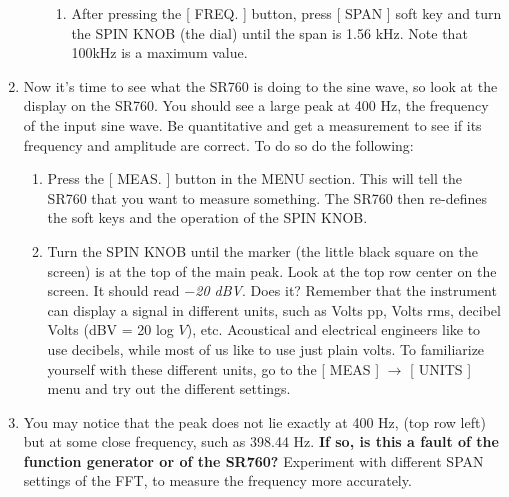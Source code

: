 \documentclass{../lab}
\begin{document}
\begin{enumerate}
\begin{enumerate}
\begin{enumerate}
            \item After pressing the [ FREQ. ] button, press [ SPAN ] soft key and turn the SPIN KNOB (the dial) until the span is 1.56 kHz. Note that 100kHz is a maximum value.

        \end{enumerate}

    \end{enumerate}

    \item Now it's time to see what the SR760 is doing to the sine wave, so look at the display on the SR760. You should see a large peak at 400 Hz, the frequency of the input sine wave. Be quantitative and get a measurement to see if its frequency and amplitude are correct. To do so do the following:
    \begin{enumerate}
        \item Press the [ MEAS. ] button in the MENU section. This will tell the SR760 that you want to measure something. The SR760 then re-defines the soft keys and the operation of the SPIN KNOB.

        \item Turn the SPIN KNOB until the marker (the little black square on the screen) is at the top of the main peak. Look at the top row center on the screen. It should read \emph{$-$20 dBV}. Does it? Remember that the instrument can display a signal in different units, such as Volts pp, Volts rms, decibel Volts (dBV = 20 log $V$), etc. Acoustical and electrical engineers like to use decibels, while most of us like to use just plain volts. To familiarize yourself with these different units, go to the [ MEAS ] $\rightarrow$ [ UNITS ] menu and try out the different settings.

    \end{enumerate}

    \item You may notice that the peak does not lie exactly at 400 Hz, (top row left) but at some close frequency, such as 398.44 Hz. \textbf{If so, is this a fault of the function generator or of the SR760?} Experiment with different SPAN settings of the FFT, to measure the frequency more accurately.


\end{enumerate}
\end{document}
